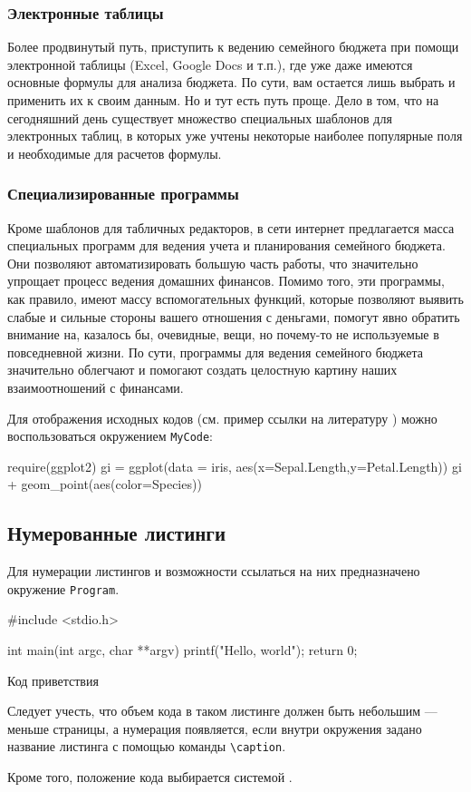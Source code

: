 \subsubsection{Электронные таблицы}
Более продвинутый путь, приступить к ведению семейного бюджета при
помощи электронной таблицы (Excel, Google Docs и т.п.), где уже даже имеются основные формулы для анализа бюджета. По сути, вам остается лишь
выбрать и применить их к своим данным. Но и тут есть путь проще.
Дело в том, что на сегодняшний день существует множество специальных
шаблонов для электронных таблиц, в которых уже учтены некоторые наиболее популярные поля и необходимые для расчетов формулы.
\subsubsection{Специализированные программы}
Кроме шаблонов для табличных редакторов, в сети интернет предлагается
масса специальных программ для ведения учета и планирования семейного
бюджета.
Они позволяют автоматизировать большую часть работы, что значительно
упрощает процесс ведения домашних финансов.
Помимо того, эти программы, как правило, имеют массу вспомогательных функций, которые позволяют выявить слабые и сильные стороны вашего отношения с деньгами, помогут явно обратить внимание на, казалось бы,
очевидные, вещи, но почему-то не используемые в повседневной жизни. По
сути, программы для ведения семейного бюджета значительно облегчают и
помогают создать целостную картину наших взаимоотношений с финансами.




Для отображения исходных кодов (см. пример ссылки на литературу \cite{Rrus1}) можно  воспользоваться окружением \verb|MyCode|:

\begin{MyCode}
require(ggplot2)
gi = ggplot(data = iris, aes(x=Sepal.Length,y=Petal.Length))
gi + geom_point(aes(color=Species))
\end{MyCode}


\subsection{Нумерованные листинги}

Для нумерации листингов и возможности ссылаться на них  предназначено окружение \verb|Program|.

\begin{Program}
\begin{MyCode}
#include <stdio.h>

int main(int argc, char **argv){
  printf("Hello, world");
  return 0;
}
\end{MyCode}
\caption{Код приветствия}
\end{Program}

Следует учесть, что объем кода в таком листинге должен быть небольшим --- меньше страницы, а нумерация появляется, если внутри окружения задано название листинга с помощью команды \verb|\caption|. 

Кроме того, положение кода выбирается системой \LaTeXe.